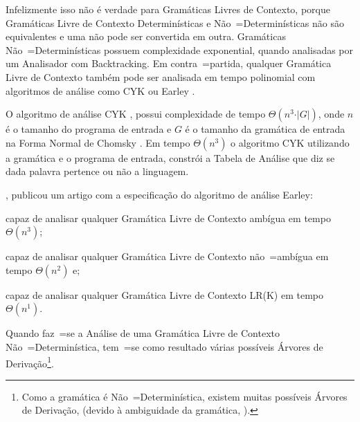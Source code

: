 Infelizmente isso não é verdade para Gramáticas Livres de Contexto,
porque Gramáticas Livre de Contexto Determinísticas e
Não~=Determinísticas não são equivalentes e
uma não pode ser convertida em outra.
Gramáticas Não~=Determinísticas possuem complexidade exponential,
quando analisadas por um Analisador com Backtracking.
Em contra~=partida,
qualquer Gramática Livre de Contexto também pode ser analisada em tempo polinomial com algoritmos de análise como CYK ou
Earley \cite{larkContextualLexer}.

O algoritmo de análise CYK \cite{hopcroftBook,larkContextualLexer},
possui complexidade de tempo $\Theta(n^3 \cdot \vert{G}\vert)$,
onde $n$ é o tamanho do programa de entrada e
$G$ é o tamanho da gramática de entrada na Forma Normal de Chomsky \cite{hopcroftBook}.
Em tempo $\Theta(n^3)$ o algoritmo CYK utilizando a gramática e
o programa de entrada,
constrói a Tabela de Análise que diz se dada palavra pertence ou
não a linguagem.

,
publicou um artigo com a especificação do algoritmo de análise Earley:
\begin{inparaenum}[1)]
\item capaz de analisar qualquer Gramática Livre de Contexto ambígua em tempo $\Theta(n^3)$;
\item capaz de analisar qualquer Gramática Livre de Contexto não~=ambígua em tempo $\Theta(n^2)$ e;
\item capaz de analisar qualquer Gramática Livre de Contexto LR(K) em tempo $\Theta(n^1)$.
\end{inparaenum}%
Quando faz~=se a Análise de uma Gramática Livre de Contexto Não~=Determinística,
tem~=se como resultado várias possíveis Árvores de Derivação\footnote{
Como a gramática é Não~=Determinística,
existem muitas possíveis Árvores de Derivação,
(devido à ambiguidade da gramática,
).
}.


